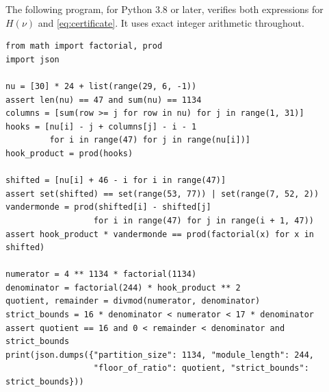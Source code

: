 \documentclass[a4paper,reqno,10pt]{amsart}
\theoremstyle{definition}
\numberwithin{equation}{section}
\begin{document}
The following program, for Python 3.8 or later, verifies both
expressions for $H(\nu)$ and
\eqref{eq:certificate}. It uses exact integer arithmetic throughout.

\begingroup\small
\begin{verbatim}
from math import factorial, prod
import json

nu = [30] * 24 + list(range(29, 6, -1))
assert len(nu) == 47 and sum(nu) == 1134
columns = [sum(row >= j for row in nu) for j in range(1, 31)]
hooks = [nu[i] - j + columns[j] - i - 1
         for i in range(47) for j in range(nu[i])]
hook_product = prod(hooks)

shifted = [nu[i] + 46 - i for i in range(47)]
assert set(shifted) == set(range(53, 77)) | set(range(7, 52, 2))
vandermonde = prod(shifted[i] - shifted[j]
                  for i in range(47) for j in range(i + 1, 47))
assert hook_product * vandermonde == prod(factorial(x) for x in shifted)

numerator = 4 ** 1134 * factorial(1134)
denominator = factorial(244) * hook_product ** 2
quotient, remainder = divmod(numerator, denominator)
strict_bounds = 16 * denominator < numerator < 17 * denominator
assert quotient == 16 and 0 < remainder < denominator and strict_bounds
print(json.dumps({"partition_size": 1134, "module_length": 244,
                  "floor_of_ratio": quotient, "strict_bounds": strict_bounds}))
\end{verbatim}
\endgroup
\end{document}
